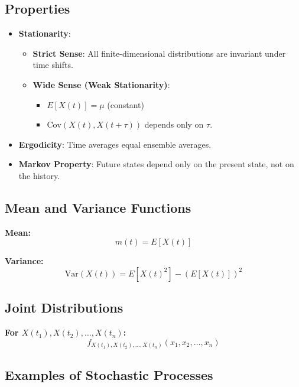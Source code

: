 \documentclass[12pt]{article}
\begin{document}
\subsection{Properties}
\begin{itemize}
    \item \textbf{Stationarity}:
    \begin{itemize}
        \item \textbf{Strict Sense}: All finite-dimensional distributions are invariant under time shifts.
        \item \textbf{Wide Sense (Weak Stationarity)}: 
        \begin{itemize}
            \item \( E[X(t)] = \mu \) (constant)
            \item \( \text{Cov}(X(t), X(t+\tau)) \) depends only on \( \tau \).
        \end{itemize}
    \end{itemize}
    \item \textbf{Ergodicity}: Time averages equal ensemble averages.
    \item \textbf{Markov Property}: Future states depend only on the present state, not on the history.
\end{itemize}

\subsection{Mean and Variance Functions}
\textbf{Mean:}
\[
m(t) = E[X(t)]
\]

\textbf{Variance:}
\[
\text{Var}(X(t)) = E[X(t)^2] - (E[X(t)])^2
\]

\subsection{Joint Distributions}
\textbf{For \( X(t_1), X(t_2), \ldots, X(t_n) \):}
\[
f_{X(t_1), X(t_2), \ldots, X(t_n)}(x_1, x_2, \ldots, x_n)
\]

\subsection{Examples of Stochastic Processes}
\end{document}
